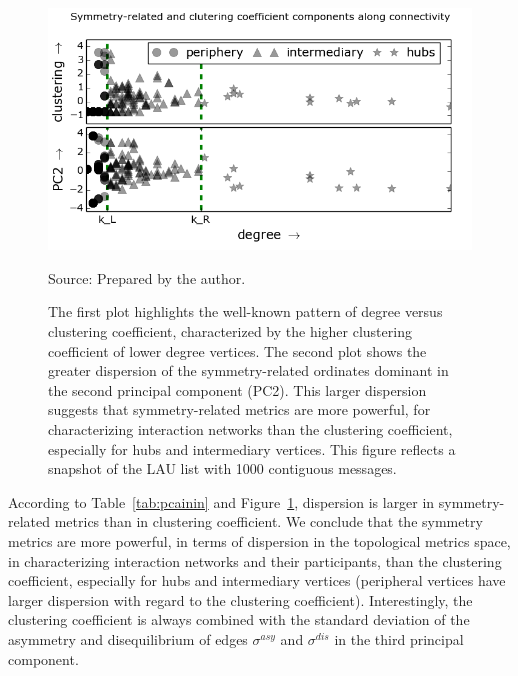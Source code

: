 \begin{figure} 
\centering
\caption{The first plot highlights the well-known pattern of degree versus clustering coefficient, characterized by the higher clustering coefficient of lower degree vertices.
 The second plot shows the greater dispersion of the symmetry-related ordinates dominant in the second principal component (PC2).
 This larger dispersion suggests that symmetry-related metrics are more powerful,
 for characterizing interaction networks than the clustering coefficient,
 especially for hubs and intermediary vertices.
 This figure reflects a snapshot of the LAU list with 1000 contiguous messages.}
 \includegraphics[width=.45\textwidth]{figs/im13PCAPLOT__}

 \label{fig:sym}
 \begin{flushleft}
Source: Prepared by the author.\
\end{flushleft}
\end{figure}

According to Table~\ref{tab:pcainin} and Figure~\ref{fig:sym},
dispersion is larger in symmetry-related metrics than in clustering coefficient.
We conclude that the symmetry metrics are more powerful, in terms of dispersion in the topological metrics space, in characterizing interaction networks and their participants, than the clustering coefficient, especially for hubs and intermediary vertices (peripheral vertices have larger dispersion with regard to the clustering coefficient).
Interestingly, the clustering coefficient is always combined
with the standard deviation of the asymmetry and disequilibrium
of edges $\sigma^{asy}$ and $\sigma^{dis}$ in the third principal component.


